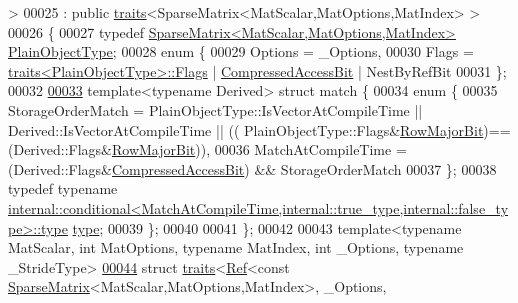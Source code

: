 \begin{DoxyCode}
      >
00025   : \textcolor{keyword}{public} \hyperlink{struct_eigen_1_1internal_1_1traits}{traits}<SparseMatrix<MatScalar,MatOptions,MatIndex> >
00026 \{
00027   \textcolor{keyword}{typedef} \hyperlink{group___sparse_core___module_class_eigen_1_1_sparse_matrix}{SparseMatrix<MatScalar,MatOptions,MatIndex>} 
      \hyperlink{group___sparse_core___module_class_eigen_1_1_sparse_matrix}{PlainObjectType};
00028   \textcolor{keyword}{enum} \{
00029     Options = \_Options,
00030     Flags = \hyperlink{struct_eigen_1_1internal_1_1traits}{traits<PlainObjectType>::Flags} | 
      \hyperlink{group__flags_gaed0244284da47a2b8661261431173caf}{CompressedAccessBit} | NestByRefBit
00031   \};
00032 
\hyperlink{struct_eigen_1_1internal_1_1traits_3_01_ref_3_01_sparse_matrix_3_01_mat_scalar_00_01_mat_optionsc6ef0ce4e339306d76a1e27f17721ded}{00033}   \textcolor{keyword}{template}<\textcolor{keyword}{typename} Derived> \textcolor{keyword}{struct }match \{
00034     \textcolor{keyword}{enum} \{
00035       StorageOrderMatch = PlainObjectType::IsVectorAtCompileTime || Derived::IsVectorAtCompileTime || ((
      PlainObjectType::Flags&\hyperlink{group__flags_gae4f56c2a60bbe4bd2e44c5b19cbe8762}{RowMajorBit})==(Derived::Flags&\hyperlink{group__flags_gae4f56c2a60bbe4bd2e44c5b19cbe8762}{RowMajorBit})),
00036       MatchAtCompileTime = (Derived::Flags&\hyperlink{group__flags_gaed0244284da47a2b8661261431173caf}{CompressedAccessBit}) && StorageOrderMatch
00037     \};
00038     \textcolor{keyword}{typedef} \textcolor{keyword}{typename} 
      \hyperlink{class_eigen_1_1internal_1_1_tensor_lazy_evaluator_writable}{internal::conditional<MatchAtCompileTime,internal::true\_type,internal::false\_type>::type}
       \hyperlink{class_eigen_1_1internal_1_1_tensor_lazy_evaluator_writable}{type};
00039   \};
00040   
00041 \};
00042 
00043 \textcolor{keyword}{template}<\textcolor{keyword}{typename} MatScalar, \textcolor{keywordtype}{int} MatOptions, \textcolor{keyword}{typename} MatIndex, \textcolor{keywordtype}{int} \_Options, \textcolor{keyword}{typename} \_Str\textcolor{keywordtype}{id}eType>
\hyperlink{struct_eigen_1_1internal_1_1traits_3_01_ref_3_01const_01_sparse_matrix_3_01_mat_scalar_00_01_mat06d17b3f87cceb06f00332b993332271}{00044} \textcolor{keyword}{struct }\hyperlink{struct_eigen_1_1internal_1_1traits}{traits}<\hyperlink{group___core___module_class_eigen_1_1_ref}{Ref}<const \hyperlink{group___sparse_core___module_class_eigen_1_1_sparse_matrix}{SparseMatrix}<MatScalar,MatOptions,MatIndex>, \_Options, 

\end{DoxyCode}
